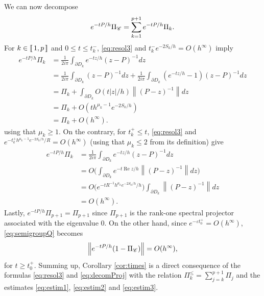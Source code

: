 \documentclass[12pt]{amsart}
\renewcommand{\Re}{\operatorname{Re}}
\numberwithin{equation}{section}
\numberwithin{figure}{section}
\newcommand{\vvert}[1]{\left\lVert#1\right\rVert}
\newcommand{\lb}{\operatorname{[\negthinspace [}}
\newcommand{\rb}{\operatorname{]\negthinspace ]}}
\begin{document}
We can now decompose
\begin{equation}\label{eq:decomProj}
e^{-tP/h}\Pi_{\mathscr C} = \sum_{k=1}^{p+1}e^{-tP/h}\Pi_k.
\end{equation}
For $k\in\lb1,p\rb$ and $0\leq t\leq t_k^-$, \eqref{eq:resol3} and $t_k^-e^{-2S_k/h} = O(h^\infty)$ %
imply
\begin{equation}\label{eq:estim1}
\begin{split}
    e^{-tP/h}\Pi_k &= \frac{1}{2i\pi}\int_{\partial D_k}e^{-tz/h}(z-P)^{-1}dz\\
    &= \frac{1}{2i\pi}\int_{\partial D_k}(z-P)^{-1}dz + \frac{1}{2i\pi}\int_{\partial D_k}(e^{-tz/h} - 1)(z-P)^{-1}dz\\
    &= \Pi_k + \int_{\partial D_k}O(t|z|/h)\vvert{(P-z)^{-1}}dz\\
    &= \Pi_k + O(th^{\mu_k-1}e^{-2S_k/h})\\
    &= \Pi_k + O(h^\infty).
\end{split}
\end{equation}
using that $\mu_k\geq1$. On the contrary, for $t_k^+\leq t$, \eqref{eq:resol3} and $e^{-t_k^+h^{\mu_k-1}e^{-2S_k/h}/R} = O(h^\infty)$ (using that $\mu_k\leq2$ from its definition) give
\begin{equation}\label{eq:estim2}
\begin{split}
    e^{-tP/h}\Pi_k &= \frac{1}{2i\pi}\int_{\partial D_k}e^{-tz/h}(z-P)^{-1}dz\\
    &= O\Big(\int_{\partial D_k}e^{-t\Re z/h}\vvert{(P-z)^{-1}}dz\Big)\\
    &= O\big(e^{-tR^{-1}h^{\mu_k}e^{-2S_k/h}/h}\big)\int_{\partial D_k}\vvert{(P-z)^{-1}}dz\\
    &= O(h^\infty).
\end{split}
\end{equation}
Lastly, %
$e^{-tP/h}\Pi_{p+1} = \Pi_{p+1}$ since $\Pi_{p+1}$ is the rank-one spectral projector associated with the eigenvalue $0$. On the other hand, since $e^{-\varepsilon t_0^+} = O(h^\infty)$, \eqref{eq:semigroupQ} becomes
\begin{equation}\label{eq:estim3}
\vvert{e^{-tP/h}(1-\Pi_\Cr)} = O(h^\infty),
\end{equation}
for $t\geq t_0^+$. Summing up, Corollary \ref{cor:times} is a direct consequence of the formulas \eqref{eq:resol3} and \eqref{eq:decomProj} with the relation $\Pi_k^\leq = \sum_{j=k}^{p+1}\Pi_j$ and the estimates \eqref{eq:estim1}, \eqref{eq:estim2} and \eqref{eq:estim3}.
\end{document}
